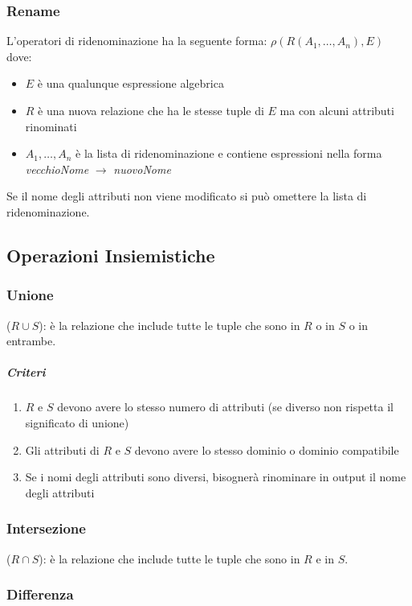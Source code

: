         \subsubsection{Rename}
            L'operatori di ridenominazione ha la seguente forma: $ \rho(R(A_1,\dots,A_n), E)$
            dove:
            \begin{itemize}
                \item $ E $ è una qualunque espressione algebrica
                \item $ R $ è una nuova relazione che ha le stesse tuple di $ E $ ma con alcuni attributi rinominati
                \item $ A_1,\dots,A_n $ è la lista di ridenominazione e contiene espressioni nella forma \textit{vecchioNome} $\rightarrow$ \textit{nuovoNome}
            \end{itemize}
            Se il nome degli attributi non viene modificato si può omettere la lista di ridenominazione.
    \subsection{Operazioni Insiemistiche}
        \subsubsection{Unione}($ R\cup S $): è la relazione che include tutte le tuple che sono in $ R $ o in $ S $ o in entrambe.
            \subparagraph{Criteri}
            \begin{enumerate}
                \item $ R $ e $ S $ devono avere lo stesso numero di attributi (se diverso non rispetta il significato di unione)
                \item Gli attributi di $ R $ e $ S $ devono avere lo stesso dominio o dominio compatibile
                \item Se i nomi degli attributi sono diversi, bisognerà rinominare in output il nome degli attributi
            \end{enumerate}
        \subsubsection{Intersezione}($ R\cap S $): è la relazione che include tutte le tuple che sono in $ R $ e in $ S $.
        \subsubsection{Differenza}
